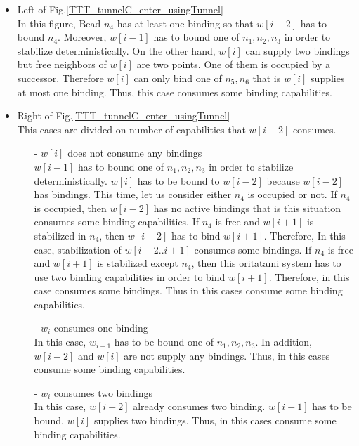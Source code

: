 \documentclass[runningheads]{llncs}
\begin{document}
\begin{itemize}
\item{Left of Fig.\ref{TTT_tunnelC_enter_usingTunnel}}\\
  In this figure, Bead $n_4$ has at least one binding so that $w[i-2]$ has to bound $n_4$. Moreover, $w[i-1]$ has to bound one of $n_1, n_2, n_3$ in order to stabilize deterministically. On the other hand, $w[i]$ can supply two bindings but free neighbors of $w[i]$ are two points. One of them is occupied by a successor. Therefore $w[i]$ can only bind one of $n_5, n_6$ that is $w[i]$ supplies at most one binding. Thus, this case consumes some binding capabilities.

\item{Right of Fig.\ref{TTT_tunnelC_enter_usingTunnel}}\\
  This cases are divided on number of capabilities that $w[i-2]$ consumes.
  \begin{itemize}
  \item[-]{$w[i]$ does not consume any bindings}\\
    $w[i-1]$ has to bound one of $n_1, n_2, n_3$ in order to stabilize deterministically. $w[i]$ has to be bound to $w[i-2]$ because $w[i-2]$ has bindings. This time, let us consider either $n_4$ is occupied or not. If $n_4$ is occupied, then $w[i-2]$ has no active bindings that is this situation consumes some binding capabilities. If $n_4$ is free and $w[i+1]$ is stabilized in $n_4$, then $w[i-2]$ has to bind $w[i+1]$. Therefore, In this case, stabilization of $w[i-2..i+1]$ consumes some bindings. If $n_4$ is free and $w[i+1]$ is stabilized except $n_4$, then this oritatami system has to use two binding capabilities in order to bind $w[i+1]$. Therefore, in this case consumes some bindings. Thus in this cases consume some binding capabilities.

  \item[-]{$w_i$ consumes one binding}\\
    In this case, $w_{i-1}$ has to be bound one of $n_1, n_2, n_3$. In addition, $w[i-2]$ and $w[i]$ are not supply any bindings. Thus, in this cases consume some binding capabilities.
  \item[-]{$w_i$ consumes two bindings}\\
    In this case, $w[i-2]$ already consumes two binding. $w[i-1]$ has to be bound. $w[i]$ supplies two bindings. Thus, in this cases consume some binding capabilities.
   
  \end{itemize}
\end{itemize}
\end{document}
